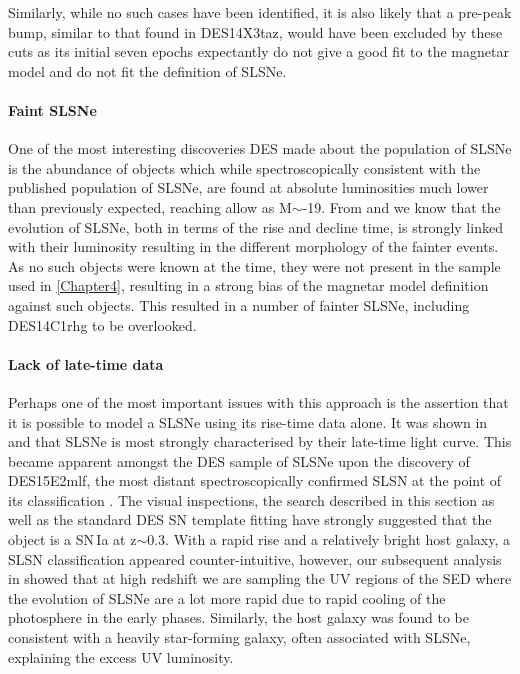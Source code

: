 Similarly, while no such cases have been identified, it is also likely that a pre-peak bump, similar to that found in DES14X3taz, would have been excluded by these cuts as its initial seven epochs expectantly do not give a good fit to the magnetar model and do not fit the definition of SLSNe.

\paragraph{Faint SLSNe}
One of the most interesting discoveries DES made about the population of SLSNe is the abundance of objects which while spectroscopically consistent with the published population of SLSNe, are found at absolute luminosities much lower than previously expected, reaching allow as M$\sim$-19. From \citet{Inserra2018a} and \citet{Nicholl2014, Nicholl2017} we know that the evolution of SLSNe, both in terms of the rise and decline time, is strongly linked with their luminosity resulting in the different morphology of the fainter events. As no such objects were known at the time, they were not present in the sample used in \cref{Chapter4}, resulting in a strong bias of the magnetar model definition against such objects. This resulted in a number of fainter SLSNe, including DES14C1rhg to be overlooked.

\paragraph{Lack of late-time data}
Perhaps one of the most important issues with this approach is the assertion that it is possible to model a SLSNe using its rise-time data alone. It was shown in \citet{Inserra2013} and \citet{Inserra2018a} that SLSNe is most strongly characterised by their late-time light curve. This became apparent amongst the DES sample of SLSNe upon the discovery of DES15E2mlf, the most distant spectroscopically confirmed SLSN at the point of its classification \citep{Pan2017}. The visual inspections, the search described in this section as well as the standard DES SN template fitting have strongly suggested that the object is a SN\,Ia at z$\sim$0.3. With a rapid rise and a relatively bright host galaxy, a SLSN classification appeared counter-intuitive, however, our subsequent analysis in \citet{Pan2017} showed that at high redshift we are sampling the UV regions of the SED where the evolution of SLSNe are a lot more rapid due to rapid cooling of the photosphere in the early phases. Similarly, the host galaxy was found to be consistent with a heavily star-forming galaxy, often associated with SLSNe, explaining the excess UV luminosity.

